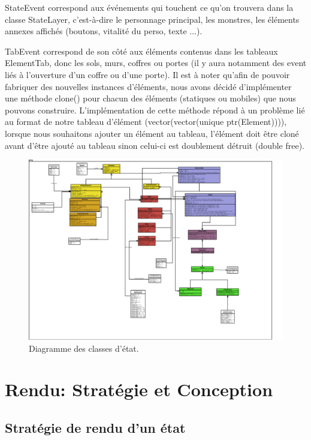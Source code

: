 \documentclass[a4paper,12pt]{article}
\begin{document}
StateEvent correspond aux événements qui touchent ce qu'on trouvera dans la classe StateLayer, c'est-à-dire le personnage principal, les monstres, les éléments annexes affichés (boutons, vitalité du perso, texte ...).

TabEvent correspond de son côté aux éléments contenus dans les tableaux ElementTab, donc les sols, murs, coffres ou portes (il y aura notamment des event liés à l'ouverture d'un coffre ou d'une porte).
\bigbreak
Il est à noter qu'afin de pouvoir fabriquer des nouvelles instances d'éléments, nous avons décidé d'implémenter une méthode clone() pour chacun des éléments (statiques ou mobiles) que nous pouvons construire. 
L'implémentation de cette méthode répond à un problème lié au format de notre tableau d'élément (vector(vector(unique ptr(Element)))), lorsque nous souhaitons ajouter un élément au tableau, l'élément doit être cloné avant d'être ajouté au tableau sinon celui-ci est doublement détruit (double free).

\begin{landscape}
\begin{figure}[p]
\includegraphics[width=0.9\paperheight]{state.pdf}
\caption{\label{uml:state}Diagramme des classes d'état.} 
\end{figure}
\end{landscape}

\clearpage

\section{Rendu: Stratégie et Conception}

\subsection{Stratégie de rendu d'un état}
\end{document}
